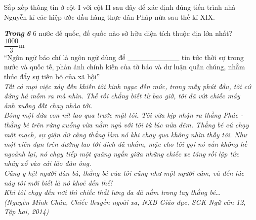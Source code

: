 \documentclass[preview,border=1pt]{standalone}
\begin{document}
	Sắp xếp thông tin ở cột I với cột II sau đây để xác định đúng tiến trình nhà Nguyễn kí các hiệp ước đầu hàng thực dân Pháp nửa sau thế kỉ XIX.\\
\begin{center}
\end{center}
\textbf{\textit{Trong}} \textbf{\textit{6}} 6 nước đế quốc, đế quốc nào sở hữu diện tích thuộc địa lớn nhất?\\
$\dfrac{1000}{3}\text{m}\text{}$\\“Ngôn ngữ báo chí là ngôn ngữ dùng để \_\_\_\_\_\_\_\_\_\_ tin tức thời sự trong nước và quốc tế, phản ánh chính kiến của tờ báo và dư luận quần chúng, nhằm thúc đẩy sự tiến bộ của xã hội\underline{}”\\\textit{Tất cả mọi việc xảy đến khiến tôi kinh ngạc đến mức, trong mấy phút đầu, tôi cứ đứng há mồm ra mà nhìn. Thế rồi chẳng biết từ bao giờ, tôi đã vứt chiếc máy ảnh xuống đất chạy nhào tới.\\Bóng một đứa con nít lao qua trước mặt tôi. Tôi vừa kịp nhận ra thằng Phác - thằng bé trên rừng xuống vừa nằm ngủ với tôi từ lúc nửa đêm. Thằng bé cứ chạy một mạch, sự giận dữ căng thẳng làm nó khi chạy qua không nhìn thấy tôi. Như một viên đạn trên đường lao tới đích đã nhắm, mặc cho tôi gọi nó vẫn không hề ngoảnh lại, nó chạy tiếp một quãng ngắn giữa những chiếc xe tăng rồi lập tức nhảy xổ vào cái lão đàn ông.\\Cũng y hệt người đàn bà, thằng bé của tôi cũng như một người câm, và đến lúc này tôi mới biết là nó khoẻ đến thế!\\Khi tôi chạy đến nơi thì chiếc thắt lưng da đã nằm trong tay thằng bé…\\(Nguyễn Minh Châu, Chiếc thuyền ngoài xa, NXB Giáo dục, SGK Ngữ văn 12, Tập hai, 2014)
}
\end{document}
